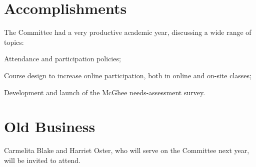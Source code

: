 \documentclass[10pt]{meetingmins}
\begin{document}
\section{Accomplishments} The Committee had a very productive academic year, discussing a wide range of topics:
\begin{items}
	\item Attendance and participation policies;
	\item Course design to increase online participation, both in online and on-site classes;
\item Development and launch of the McGhee needs-assessment survey.
\end{items}
\section{Old Business}
\priormins

\vspace{1em}
 Carmelita Blake and Harriet Oster, who will serve on the Committee next year, will be invited to attend.
\end{document}
